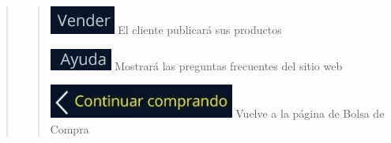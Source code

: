 \documentclass[14pt]{article}
\begin{document}
\begin{quote}
\begin{quote}
                            \includegraphics[height=0.02\textwidth]{BotonVender.jpg}
                            \label{P9:BotonVender} El cliente publicará sus productos
                            
                            \includegraphics[height=0.02\textwidth]{BotonAyuda.jpg}
                            \label{P9:BotonAyuda} Mostrará las preguntas frecuentes del sitio web
                            
                            \includegraphics[height=0.02\textwidth]{BotonContinuarComprando.jpg}
                            \label{P9:BotonContinuarComprando} Vuelve a la página de Bolsa de Compra
                        \end{quote}
                \end{quote} \label{PE Pantalla Error} \label{PN:EliminarMetodosDePago} \label{PN:BotonAgregarDirección} \label{P6:BotonAgregarTarjeta} \label{P8:BotonCerrar} \label{P10 Carrito de Compra}\label{P10:EliminarProducto} \label{P11 Métodos de Pago}\label{P12 Direcciones de Envío}
    
    \newpage
\end{document}
